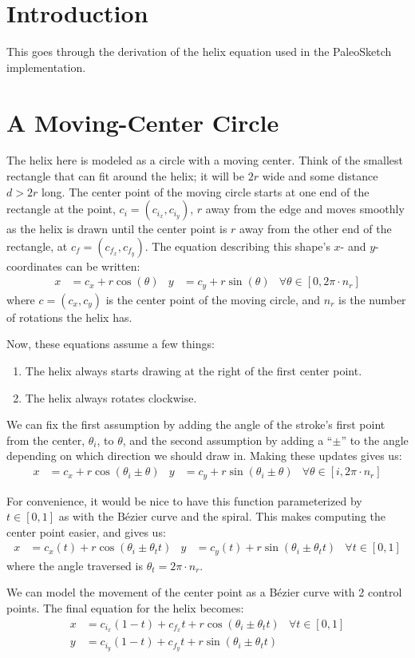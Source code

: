 \documentclass{article}
\begin{document}
\section{Introduction}

This goes through the derivation of the helix equation used in the PaleoSketch implementation.

\section{A Moving-Center Circle}

The helix here is modeled as a circle with a moving center.  Think of the smallest rectangle that can fit around the helix; it will be $2r$ wide and some distance $d>2r$ long.  The center point of the moving circle starts at one end of the rectangle at the point, $c_i=(c_{i_x},c_{i_y})$, $r$ away from the edge and moves smoothly as the helix is drawn until the center point is $r$ away from the other end of the rectangle, at $c_f=(c_{f_x},c_{f_y})$.  The equation describing this shape's $x$- and $y$-coordinates can be written:
\begin{align*}
  x &= c_x + r\cos(\theta) & y &= c_y + r\sin(\theta) & \forall\theta\in[0,2\pi\cdot n_r]
\end{align*}
where $c=(c_x,c_y)$ is the center point of the moving circle, and $n_r$ is the number of rotations the helix has.

Now, these equations assume a few things:
\begin{enumerate}
  \item The helix always starts drawing at the right of the first center point.
  \item The helix always rotates clockwise.
\end{enumerate}
We can fix the first assumption by adding the angle of the stroke's first point from the center, $\theta_i$, to $\theta$, and the second assumption by adding a ``$\pm$'' to the angle depending on which direction we should draw in.  Making these updates gives us:
\begin{align*}
  x &= c_x + r\cos(\theta_i\pm\theta) & y &= c_y + r\sin(\theta_i\pm\theta) & \forall\theta\in[i,2\pi\cdot n_r]
\end{align*}

For convenience, it would be nice to have this function parameterized by $t\in[0,1]$ as with the B\'ezier curve and the spiral.  This makes computing the center point easier, and gives us:
\begin{align*}
  x &= c_x(t) + r\cos(\theta_i\pm\theta_t t) & y &= c_y(t) + r\sin(\theta_i\pm\theta_t t) & \forall t\in[0,1]
\end{align*}
where the angle traversed is $\theta_t=2\pi\cdot n_r$.

We can model the movement of the center point as a B\'ezier curve with 2 control points.  The final equation for the helix becomes:
\begin{align*}
  x &= c_{i_x}(1-t)+c_{f_x}t + r\cos(\theta_i\pm\theta_t t) & \forall t\in[0,1] \\
  y &= c_{i_y}(1-t)+c_{f_y}t + r\sin(\theta_i\pm\theta_t t)
\end{align*}
\end{document}
